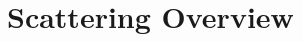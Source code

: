 \documentclass[12pt, oneside]{article}   	%
\theoremstyle{definition}
\begin{document}
	
	
	


\section*{Scattering Overview}
\end{document}
